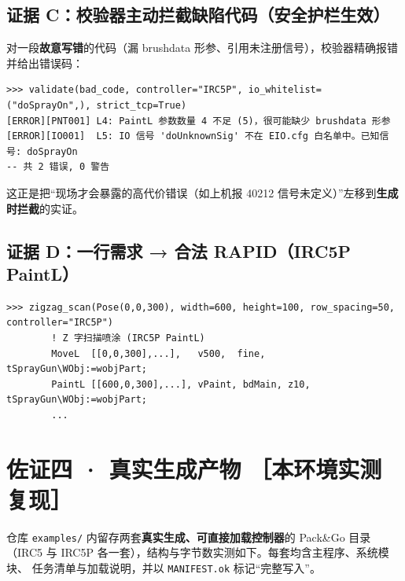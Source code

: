 \documentclass[11pt,a4paper,fontset=none]{ctexart}
\begin{document}
\subsection{证据 C：校验器主动拦截缺陷代码（安全护栏生效）}
对一段\textbf{故意写错}的代码（漏 brushdata 形参、引用未注册信号），校验器精确报错并给出错误码：
\begin{lstlisting}[style=console]
>>> validate(bad_code, controller="IRC5P", io_whitelist=("doSprayOn",), strict_tcp=True)
[ERROR][PNT001] L4: PaintL 参数数量 4 不足 (5)，很可能缺少 brushdata 形参
[ERROR][IO001]  L5: IO 信号 'doUnknownSig' 不在 EIO.cfg 白名单中。已知信号: doSprayOn
-- 共 2 错误, 0 警告
\end{lstlisting}
\noindent 这正是把“现场才会暴露的高代价错误（如上机报 40212 信号未定义）”左移到\textbf{生成时拦截}的实证。

\subsection{证据 D：一行需求 → 合法 RAPID（IRC5P PaintL）}
\begin{lstlisting}[style=console]
>>> zigzag_scan(Pose(0,0,300), width=600, height=100, row_spacing=50, controller="IRC5P")
        ! Z 字扫描喷涂 (IRC5P PaintL)
        MoveL  [[0,0,300],...],   v500,  fine, tSprayGun\WObj:=wobjPart;
        PaintL [[600,0,300],...], vPaint, bdMain, z10, tSprayGun\WObj:=wobjPart;
        ...
\end{lstlisting}

\section{佐证四 · 真实生成产物 \normalfont\small［本环境实测复现］}

仓库 \texttt{examples/} 内留存两套\textbf{真实生成、可直接加载控制器}的 Pack\&Go 目录
（IRC5 与 IRC5P 各一套），结构与字节数实测如下。每套均含主程序、系统模块、
任务清单与加载说明，并以 \texttt{MANIFEST.ok} 标记“完整写入”。
\end{document}
